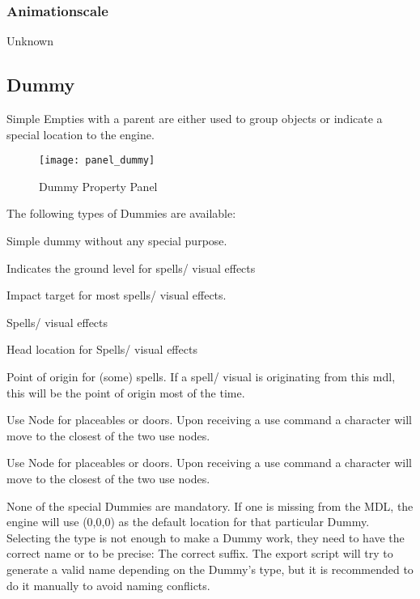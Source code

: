 \subsubsection*{Animationscale}
Unknown

\subsection{Dummy}
Simple Empties with a parent are either used to group objects or
indicate a special location to the engine. \\

\begin{figure}
  \centering
  \texttt{[image: panel\_dummy]}
  \caption[panel dummy]{Dummy Property Panel}
  \label{fig:panel_dummy}
\end{figure}

The following types of Dummies are available:
\begin{description}[leftmargin=6em,style=nextline]
    \item[None] Simple dummy without any special purpose.
    \item[Ground] Indicates the ground level for spells/ visual effects
    \item[Impact] Impact target for most spells/ visual effects.
    \item[Head Hit] Spells/ visual effects
    \item[Head] Head location for Spells/ visual effects
    \item[Hand] Point of origin for (some) spells. If a spell/ visual is originating from this mdl, this will be the point of origin most of the time.
    \item[Use 1] Use Node for placeables or doors. Upon receiving a use command a character will move to the closest of the two use nodes.
    \item[Use 2] Use Node for placeables or doors. Upon receiving a use command a character will move to the closest of the two use nodes.
\end{description}
None of the special Dummies are mandatory. If one is
missing from the MDL, the engine will use (0,0,0) as the default location
for that particular Dummy. \\

Selecting the type is not enough to make a Dummy work, they need to have
the correct name or to be precise: The correct suffix.
The export script will try to generate a valid name depending on
the Dummy's type, but it is recommended to do it manually to avoid naming
conflicts. \\

